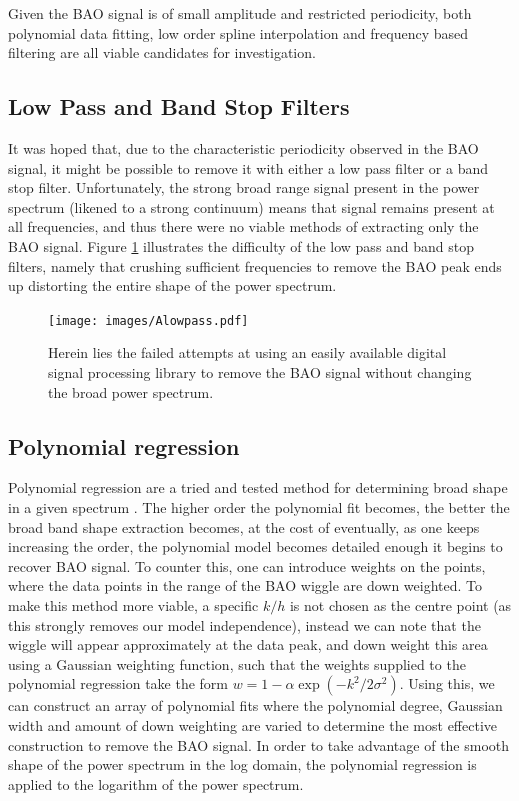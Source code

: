 \documentclass[titlesmallcaps, examinerscopy, copyrightpage]{uqthesis}
\begin{document}
\begin{appendices}
Given the BAO signal is of small amplitude and restricted periodicity, both polynomial data fitting, low order spline interpolation and frequency based filtering are all viable candidates for investigation.

\subsection{Low Pass and Band Stop Filters}

It was hoped that, due to the characteristic periodicity observed in the BAO signal, it might be possible to remove it with either a low pass filter or a band stop filter. Unfortunately, the strong broad range signal present in the power spectrum (likened to a strong continuum) means that signal remains present at all frequencies, and thus there were no viable methods of extracting only the BAO signal. Figure \ref{fig:Alowpass} illustrates the difficulty of the low pass and band stop filters, namely that crushing sufficient frequencies to remove the BAO peak ends up distorting the entire shape of the power spectrum.

\begin{figure}[h]
  \begin{center}
    \texttt{[image: images/Alowpass.pdf]}
  	\caption{Herein lies the failed attempts at using an easily available digital signal processing library to remove the BAO signal without changing the broad power spectrum.}
  	\label{fig:Alowpass}
  \end{center}
\end{figure}

\subsection{Polynomial regression}

Polynomial regression are a tried and tested method for determining broad shape in a given spectrum \citep{baldry2014galaxy}. The higher order the polynomial fit becomes, the better the broad band shape extraction becomes, at the cost of eventually, as one keeps increasing the order, the polynomial model becomes detailed enough it begins to recover BAO signal. To counter this, one can introduce weights on the points, where the data points in the range of the BAO wiggle are down weighted. To make this method more viable, a specific $k/h$ is not chosen as the centre point (as this strongly removes our model independence), instead we can note that the wiggle will appear approximately at the data peak, and down weight this area using a Gaussian weighting function, such that the weights supplied to the polynomial regression take the form $w = 1 - \alpha \exp\left(-k^2/2 \sigma^2\right)$. Using this, we can construct an array of polynomial fits where the polynomial degree, Gaussian width and amount of down weighting are varied to determine the most effective construction to remove the BAO signal. In order to take advantage of the smooth shape of the power spectrum in the log domain, the polynomial regression is applied to the logarithm of the power spectrum.



\end{appendices}
\end{document}
